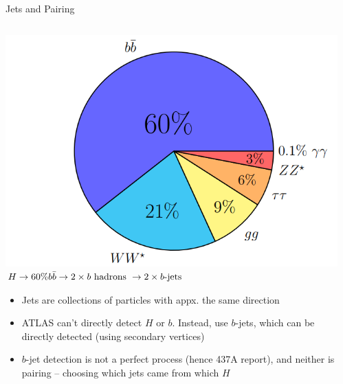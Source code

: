 \documentclass[10pt, aspectratio=169]{beamer}
\begin{document}
{
\begin{frame}{Jets and Pairing}
  \begin{columns}[onlytextwidth]
    \begin{column}{0.76\textwidth}
      \centering
      \includegraphics[width=0.35\linewidth]{images/branching_ratios.png}\\
      $H \to 60\%\space b\bar{b} \to 2 \times b \text{ hadrons } \to 2 \times b\text{-jets}$
      \begin{itemize}
        \item \alert{Jets} are collections of particles with appx. the same direction
        \item ATLAS can't directly detect $H$ or $b$. Instead, use \alert{$b$-jets}, which can be directly detected (using secondary vertices)
        \item $b$-jet detection is not a perfect process (hence 437A report), and neither is \alert{pairing} -- choosing which jets came from which $H$
      \end{itemize}
    \end{column}
    \begin{column}{0.25\textwidth}

\end{column}
\end{columns}
\end{frame}}
\end{document}

